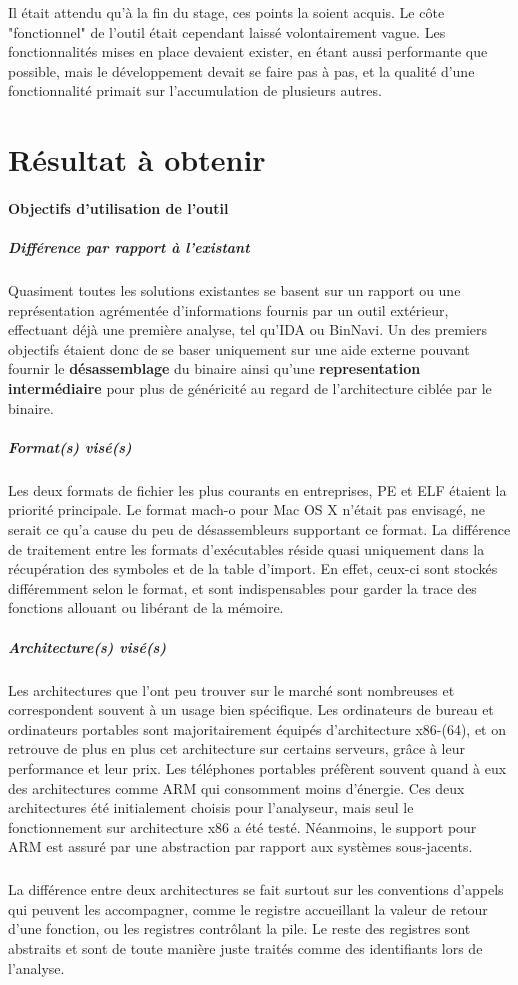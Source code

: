 Il était attendu qu'à la fin du stage, ces points la soient acquis. Le côte "fonctionnel"
de l'outil était cependant laissé volontairement vague. Les fonctionnalités mises en place
devaient exister, en étant aussi performante que possible, mais le développement devait se faire
pas à pas, et la qualité d'une fonctionnalité primait sur l'accumulation de plusieurs autres.

\section{Résultat à obtenir}
\paragraph{Objectifs d'utilisation de l'outil}

\subparagraph{Différence par rapport à l'existant}

Quasiment toutes les solutions existantes se basent sur un rapport ou une représentation agrémentée d'informations fournis
par un outil extérieur, effectuant déjà une première analyse, tel qu'IDA ou BinNavi. Un des premiers objectifs étaient donc de
se baser uniquement sur une aide externe pouvant fournir le \textbf{désassemblage} du binaire ainsi qu'une \textbf{representation intermédiaire}
pour plus de généricité au regard de l'architecture ciblée par le binaire.

\subparagraph{Format(s) visé(s)}

Les deux formats de fichier les plus courants en entreprises, PE et ELF étaient la priorité principale. Le format mach-o pour
Mac OS X n'était pas envisagé, ne serait ce qu'a cause du peu de désassembleurs supportant ce format. La différence de traitement
entre les formats d'exécutables réside quasi uniquement dans la récupération des symboles et de la table d'import. En effet, ceux-ci
sont stockés différemment selon le format, et sont indispensables pour garder la trace des fonctions allouant ou libérant de la mémoire.

\subparagraph{Architecture(s) visé(s)}
Les architectures que l'ont peu trouver sur le marché sont nombreuses et correspondent souvent à un usage bien spécifique.
Les ordinateurs de bureau et ordinateurs portables sont majoritairement équipés d'architecture x86-(64), et on retrouve de plus en plus
cet architecture sur certains serveurs, grâce à leur performance et leur prix. Les téléphones portables préfèrent souvent quand à eux
des architectures comme ARM qui consomment moins d'énergie. Ces deux architectures été initialement choisis pour l'analyseur, mais seul
le fonctionnement sur architecture x86 a été testé. Néanmoins, le support pour ARM est assuré par une abstraction par rapport aux systèmes
sous-jacents.
\subparagraph{}
La différence entre deux architectures se fait surtout sur les conventions d'appels qui peuvent les accompagner, comme le registre accueillant
la valeur de retour d'une fonction, ou les registres contrôlant la pile. Le reste des registres sont abstraits et sont de toute manière
juste traités comme des identifiants lors de l'analyse.


